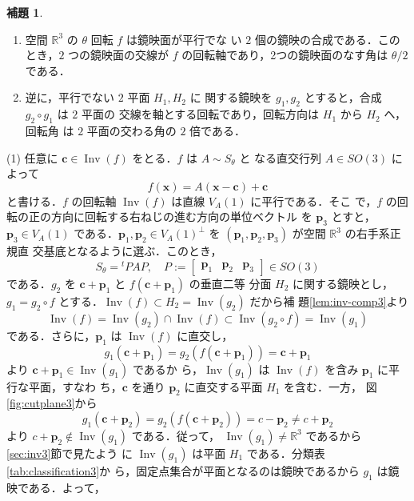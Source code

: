 \documentclass[11pt, uplatex, dvipdfmx, titlepage]{jsarticle}
\makeatletter
\DeclareMathOperator{\Inv}{Inv}
\renewenvironment{proof}[1][\proofname]{\par
  \pushQED{\qed}%
  \normalfont \topsep6\p@\@plus6\p@\relax
  \trivlist
  \item[\hskip\labelsep
         \bfseries
    {#1}]\ignorespaces
}{%
  \popQED\endtrivlist\@endpefalse
}
\theoremstyle{definition}
\newtheorem{lemma}{補題}[section]
\renewcommand{\proofname}{\textbf{証明}}
\makeatother
\begin{document}
\begin{lemma}\label{lem:rotation3}
  \begin{enumerate}[(1)]
  \item 空間 $\mathbb{R}^3$ の $\theta$ 回転 $f$ は鏡映面が平行でな
    い $2$ 個の鏡映の合成である．このとき，$2$ つの鏡映面の交線が $f$
    の回転軸であり，2つの鏡映面のなす角は $\theta/2$ である．
    
  \item 逆に，平行でない $2$ 平面 $H_1, H_2$ に
  関する鏡映を $g_1, g_2$ とすると，合成 $g_2 \circ g_1$ は $2$ 平面の
  交線を軸とする回転であり，回転方向は $H_1$ から $H_2$ へ，回転角
  は $2$ 平面の交わる角の $2$ 倍である．
  \end{enumerate}
\end{lemma}

\begin{proof}
  (1) 任意に $\bm{c} \in \Inv(f)$ をとる．$f$ は $A \sim S_{\theta}$ と
  なる直交行列 $A \in SO(3)$ によって
  \[
    f(\bm{x}) = A(\bm{x} - \bm{c}) + \bm{c}
  \]
  と書ける．$f$ の回転軸 $\Inv(f)$ は直線 $V_A(1)$ に平行である．そこ
  で，$f$ の回転の正の方向に回転する右ねじの進む方向の単位ベクトル
  を $\bm{p}_3$ とすと，$\bm{p}_3 \in V_A(1)$
  である．$\bm{p}_1, \bm{p}_2 \in V_A(1)^{\perp}$ を
  $(\bm{p}_1, \bm{p}_2, \bm{p}_3)$ が空間 $\mathbb{R}^3$ の右手系正規直
  交基底となるように選ぶ．このとき，
  \[
     S_{\theta} = {}^{t}PAP, \quad P := \left[
      \begin{array}{ccc}
        \bm{p}_1 & \bm{p}_2 & \bm{p}_3
      \end{array}
    \right]\in SO(3)
  \]
  である．$g_2$ を $\bm{c}+\bm{p}_1$ と $f(\bm{c}+\bm{p}_1)$ の垂直二等
  分面 $H_2$ に関する鏡映とし，$g_1 = g_2 \circ f$
  とする．$\Inv(f) \subset H_2 = \Inv(g_2)$ だから補
  題\ref{lem:inv-comp3}より
  \[
    \Inv(f) = \Inv(g_2) \cap \Inv(f) \subset \Inv(g_2 \circ f) = \Inv(g_1)
  \]
  である．さらに，$\bm{p}_1$ は $\Inv(f)$ に直交し，
  \[
    g_1 (\bm{c}+\bm{p}_1) = g_2 \left( f(\bm{c}+\bm{p}_1)\right) = \bm{c}+\bm{p}_1
  \]
  より $\bm{c}+\bm{p}_1 \in \Inv(g_1)$ であるか
  ら，$\Inv(g_1)$ は $\Inv(f)$ を含み $\bm{p}_1$ に平行な平面，すなわ
  ち，$\bm{c}$ を通り $\bm{p}_2$ に直交する平面 $H_1$ を含む．一方，
  図\ref{fig:cutplane3}から
  \[
    g_1(\bm{c} + \bm{p}_2) = g_2 \left( f(\bm{c}+\bm{p}_2) \right) = c-\bm{p}_2 \neq c+\bm{p}_2
  \]より $c+\bm{p}_2 \notin \Inv(g_1)$ である．従って，
  $\Inv(g_1) \neq \mathbb{R}^3$ であるから \ref{sec:inv3}節で見たよう
  に $\Inv(g_1)$ は平面 $H_1$ である．分類表\ref{tab:classification3}か
  ら，固定点集合が平面となるのは鏡映であるから $g_1$ は鏡映である．よって，

\end{proof}
\end{document}
